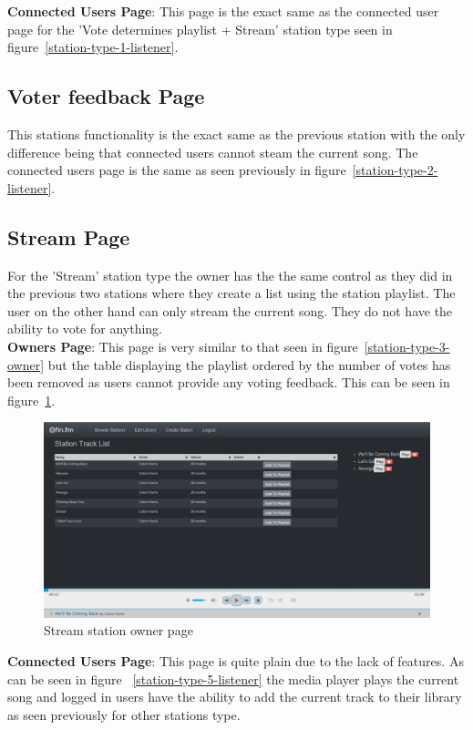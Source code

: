 \documentclass[a4paper, 12pt]{report}
\begin{document}
\textbf{Connected Users Page}: This page is the exact same as the connected user page for the 'Vote determines playlist + Stream' station type seen in figure~\ref{station-type-1-listener}.

\subsection{Voter feedback Page}
This stations functionality is the exact same as the previous station with the only difference being that connected users cannot steam the current song. The connected users page is the same as seen previously in figure~\ref{station-type-2-listener}.

\subsection{Stream Page}
For the 'Stream' station type the owner has the the same control as they did in the previous two stations where they create a list using the station playlist. The user on the other hand can only stream the current song. They do not have the ability to vote for anything.\\

\textbf{Owners Page}: This page is very similar to that seen in figure~\ref{station-type-3-owner} but the table displaying the playlist ordered by the number of votes has been removed as users cannot provide any voting feedback. This can be seen in figure~\ref{station-type-5-owner}.

\begin{figure}[H]
  \centering
    \includegraphics[width=1.0\textwidth]{screenshots/station-type-5-owner.png}
    \caption{Stream station owner page}
    \label{station-type-5-owner}
\end{figure}

\textbf{Connected Users Page}: This page is quite plain due to the lack of features. As can be seen in figure ~\ref{station-type-5-listener} the media player plays the current song and logged in users have the ability to add the current track to their library as seen previously for other stations type.
\end{document}
